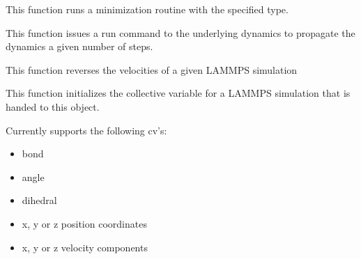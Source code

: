\documentclass[letterpaper,10pt,english]{sphinxmanual}
\begin{document}
\begin{fulllineitems}

\begin{fulllineitems}
\label{src/src.doc:lammpsWalker.lammpsWalker.minimize}
This function runs a minimization routine with the specified type.

\end{fulllineitems}


\begin{fulllineitems}
\label{src/src.doc:lammpsWalker.lammpsWalker.propagate}
This function issues a run command to the underlying dynamics to propagate
the dynamics a given number of steps.

\end{fulllineitems}


\begin{fulllineitems}
\label{src/src.doc:lammpsWalker.lammpsWalker.reverseVel}
This function reverses the velocities of a given LAMMPS simulation

\end{fulllineitems}


\begin{fulllineitems}
\label{src/src.doc:lammpsWalker.lammpsWalker.setColvars}
This function initializes the collective variable for a LAMMPS simulation that is handed to this object.

Currently supports the following cv's:
\begin{itemize}
\item {} 
bond

\item {} 
angle

\item {} 
dihedral

\item {} 
x, y or z position coordinates

\item {} 
x, y or z velocity components


\end{itemize}
\end{fulllineitems}
\end{fulllineitems}
\end{document}
